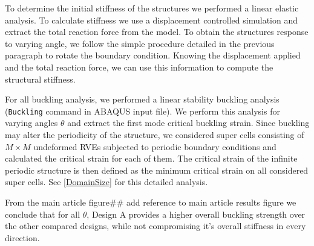 \documentclass[10pt,twoside]{fernandes_supp}
\newcommand{\mf}[1]{\colorbox{blue!10}{\color{color3}#1}}
\begin{document}
To determine the initial stiffness of the structures we performed a linear elastic analysis. To calculate stiffness we use a displacement controlled simulation and extract the total reaction force from the model. To obtain the structures response to varying angle, we follow the simple procedure detailed in the previous paragraph to rotate the boundary condition. Knowing the displacement applied and the total reaction force, we can use this information to compute the structural stiffness.

For all buckling analysis, we performed a linear stability buckling analysis ({\tt *Buckling} command in ABAQUS input file). We perform this analysis for varying angles $\theta$ and extract the first mode critical buckling strain. Since buckling may alter the periodicity of the
structure, we considered super cells consisting of $M \times M$
undeformed RVEs subjected to periodic boundary
conditions and calculated the critical strain for each of
them. The critical strain of the infinite periodic structure is
then defined as the minimum critical strain on all considered
super cells. See \cref{DomainSize} for this detailed analysis.

From the main article figure\#\# \mf{add reference to main article results figure} we conclude that for all $\theta$, Design A provides a higher overall buckling strength over the other compared designs, while not compromising it's overall stiffness in every direction.

\end{document}
